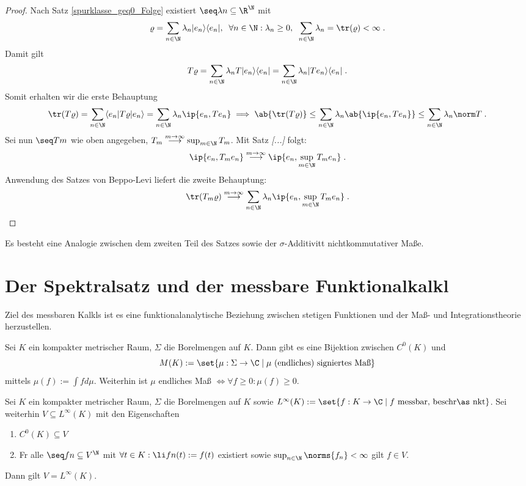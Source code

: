 \begin{proof}
	Nach Satz \ref{spurklasse_geq0_Folge} existiert \(\seq \lambda n \subseteq \R^\N\) mit 
	\[\varrho = \sum_{n\in\N} \lambda_n | e_n \rangle \langle e_n |, \;\; \forall n\in\N: \lambda_n \geq 0, \;\;\sum_{n\in\N} \lambda_n = \tr(\varrho) < \infty\;.\]
	Damit gilt
	\[T\varrho = \sum_{n\in\N} \lambda_n T | e_n \rangle \langle e_n | = \sum_{n\in\N} \lambda_n | Te_n \rangle \langle e_n | \;.\]
	Somit erhalten wir die erste Behauptung
	\[\tr(T\varrho) = \sum_{n\in\N} \langle e_n | T\varrho | e_n \rangle = \sum_{n\in\N} \lambda_n \ip{e_n, Te_n} \implies \ab{\tr(T\varrho)} \leq \sum_{n\in\N} \lambda_n \ab{\ip{e_n, Te_n}} \leq \sum_{n\in\N} \lambda_n\norm T\;.\]
	Sei nun \(\seq Tm\) wie oben angegeben, \(T_m \overset{m\to\infty}{\longrightarrow} \sup_{m\in\N}T_m\). Mit Satz \textit{[...]} folgt:
	\[\ip{e_n, T_m e_n} \overset{m\to\infty}{\longrightarrow} \ip{e_n, \sup_{m\in\N} T_m e_n}\;.\]
	Anwendung des Satzes von Beppo-Levi liefert die zweite Behauptung:
	\[\tr(T_m\varrho)\overset{m\to\infty}{\longrightarrow}  \sum_{n\in\N} \lambda_n\ip{e_n, \sup_{m\in\N} T_m e_n}\;.\]
\end{proof}
\begin{rem}
	Es besteht eine Analogie zwischen dem zweiten Teil des Satzes sowie der $\sigma$-Additivit\as t nichtkommutativer Ma\ss{}e. 
\end{rem}

\section{Der Spektralsatz und der messbare Funktionalkalk\us l}
\begin{rem}
	Ziel des messbaren Kalk\us ls ist es eine funktionalanalytische Beziehung zwischen stetigen Funktionen und der Ma\ss{}- und Integrationstheorie herzustellen.
\end{rem}

\begin{theorem}
	Sei $K$ ein kompakter metrischer Raum, $\Sigma$ die Borelmengen auf $K$. Dann gibt es eine Bijektion zwischen $C^0(K)$ und 
	\[M(K) := \set{\mu:\Sigma \to \C\;\vert\; \mu \text{ (endliches) signiertes Ma\ss{}}}\]
	mittels \(\mu(f):= \int f d\mu\). Weiterhin ist $\mu$ endliches Ma\ss{} \(\iff \forall f \geq 0 : \mu(f) \geq 0\).
\end{theorem}

\begin{theorem}
	Sei $K$ ein kompakter metrischer Raum, $\Sigma$ die Borelmengen auf $K$ sowie \(L^\infty(K):= \set{f: K\to\C\;\vert\; f \text{ messbar, beschr\as nkt}}\). Sei weiterhin \(V\subseteq L^\infty(K)\) mit den Eigenschaften
	\begin{enumerate}
		\item \(C^0(K)\subseteq V\)
		\item F\us r alle \(\seq fn \subseteq V^\N\) mit \(\forall t \in K: \li fn(t) := f(t)\) existiert sowie  \(\sup_{n\in\N}\norms{f_n} < \infty\) gilt \(f\in V\). \label{lemma_mess_kalk_2}
	\end{enumerate}
	Dann gilt \(V = L^\infty(K)\).
\end{theorem}

